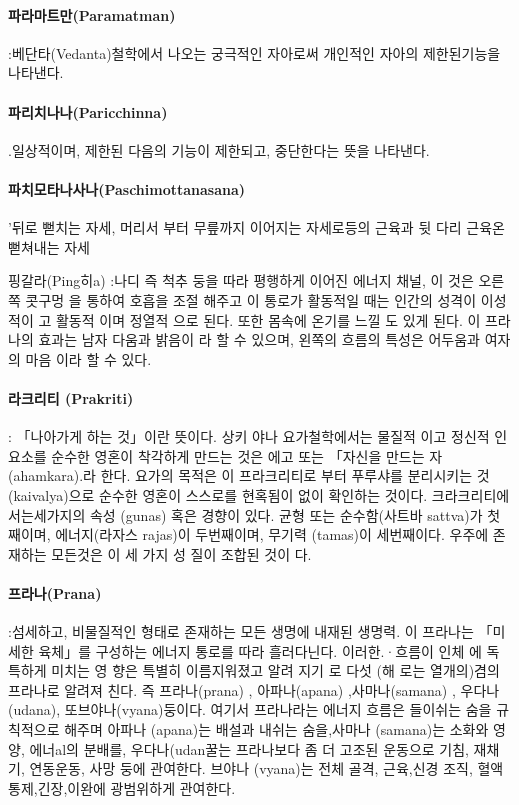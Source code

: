 \documentclass[12pt, a4paper, oneside]{book}
\begin{document}
\paragraph{파라마트만(Paramatman)}:베단타(Vedanta)철학에서 나오는 궁극적인 자아로써 개인적인 자아의 제한된기능을 나타낸다.

\paragraph{파리치나나(Paricchinna)} .일상적이며, 제한된 다음의 기능이 제한되고, 중단한다는 뜻을 나타낸다.

\paragraph{파치모타나사나(Paschimottanasana)} '뒤로 뻗치는 자세, 머리서 부터 무릎까지 이어지는 자세로등의 근육과 뒷 다리 근육온 뻗쳐내는 자세

핑갈라(Ping히a) :나디 즉 척추 둥을 따라 평행하게 이어진 에너지 채널, 이 것은 오른쪽 콧구멍 을 통하여 호흡을 조절 해주고 이 통로가 활동적일 때는 인간의 성격이 이성적이   고 활동적 이며 정열적 으로 된다. 또한 몸속에 온기를 느낄 도 있게 된다. 이 프라나의 효과는 남자 다움과 밝음이 라 할 수 있으며, 왼쪽의 흐름의 특성은 어두움과 여자의 마음  이라 할 수 있다.

\paragraph{라크리티 (Prakriti)} : 「나아가게 하는 것」이란 뜻이다. 상키 야나 요가철학에서는 물질적 이고 정신적 인 요소를 순수한 영혼이 착각하게 만드는 것은 에고 또는 「자신을 만드는   자(ahamkara).라 한다. 요가의 목적은 이 프라크리티로 부터 푸루샤를 분리시키는 것 (kaivalya)으로 순수한 영혼이 스스로를 현혹됨이 없이 확인하는 것이다. 크라크리티에서는세가지의 속성 (gunas) 혹은 경향이 있다. 균형 또는 순수함(사트바 sattva)가 첫째이며, 에너지(라자스 rajas)이 두번째이며, 무기력 (tamas)이 세번째이다. 우주에 존재하는 모든것은 이 세 가지 성 질이 조합된 것이 다.

\paragraph{프라나(Prana)} :섬세하고, 비물질적인 형태로 존재하는 모든 생명에 내재된 생명력. 이 프라나는 「미세한 육체」를 구성하는 에너지 통로를 따라 흘러다닌다. 이러한.·흐름이 인체 에 독특하게 미치는 영 향은 특별히 이름지워졌고 알려 지기 로 다섯 (해 로는 열개의)겸의 프라나로 알려져 친다. 즉 프라나(prana) , 아파나(apana) ,사마나(samana) , 우다나(udana), 또브야나(vyana)둥이다. 여기서 프라나라는 에너지 흐름은 들이쉬는 숨을 규칙적으로 해주며 아파나 (apana)는 배설과 내쉬는 숨을,사마나 (samana)는 소화와 영양, 에너al의 분배를, 우다나(udan꿀는 프라나보다 좀 더 고조된 운동으로 기침, 재채기, 연동운동, 사망 둥에 관여한다. 브야나 (vyana)는 전체 골격, 근육,신경 조직, 혈액통제,긴장,이완에 광범위하게 관여한다.
\end{document}
